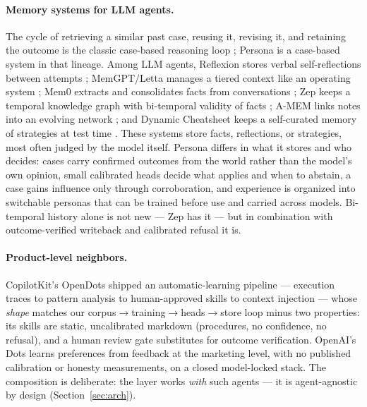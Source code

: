 \documentclass[11pt]{article}
\begin{document}
\paragraph{Memory systems for LLM agents.} The cycle of retrieving a similar past case, reusing it, revising it, and retaining the outcome is the classic case-based reasoning loop \cite{aamodt1994cbr}; Persona is a case-based system in that lineage. Among LLM agents, Reflexion stores verbal self-reflections between attempts \cite{shinn2023reflexion}; MemGPT/Letta manages a tiered context like an operating system \cite{packer2023memgpt}; Mem0 extracts and consolidates facts from conversations \cite{chhikara2025mem0}; Zep keeps a temporal knowledge graph with bi-temporal validity of facts \cite{rasmussen2025zep}; A-MEM links notes into an evolving network \cite{xu2025amem}; and Dynamic Cheatsheet keeps a self-curated memory of strategies at test time \cite{suzgun2025cheatsheet}. These systems store facts, reflections, or strategies, most often judged by the model itself. Persona differs in what it stores and who decides: cases carry confirmed outcomes from the world rather than the model's own opinion, small calibrated heads decide what applies and when to abstain, a case gains influence only through corroboration, and experience is organized into switchable personas that can be trained before use and carried across models. Bi-temporal history alone is not new --- Zep has it --- but in combination with outcome-verified writeback and calibrated refusal it is.

\paragraph{Product-level neighbors.} CopilotKit's OpenDots \cite{copilotkit2026opendots} shipped an automatic-learning pipeline --- execution traces to pattern analysis to human-approved skills to context injection --- whose \emph{shape} matches our corpus$\to$training$\to$heads$\to$store loop minus two properties: its skills are static, uncalibrated markdown (procedures, no confidence, no refusal), and a human review gate substitutes for outcome verification. OpenAI's Dots learns preferences from feedback at the marketing level, with no published calibration or honesty measurements, on a closed model-locked stack. The composition is deliberate: the layer works \emph{with} such agents --- it is agent-agnostic by design (Section~\ref{sec:arch}).
\end{document}
